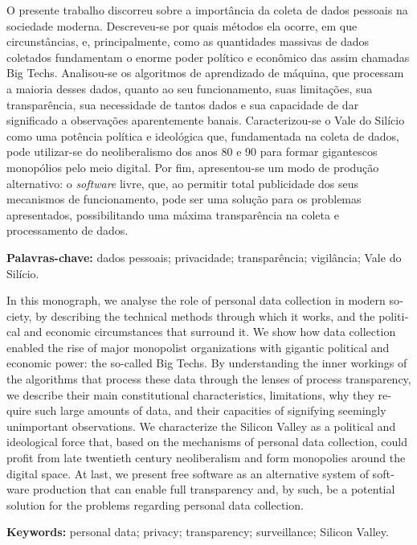 \begin{resumo}
\vspace{\onelineskip}
O presente trabalho discorreu sobre a importância da coleta de dados pessoais na sociedade moderna.
Descreveu-se por quais métodos ela ocorre, em que circunstâncias, e, principalmente, como as quantidades massivas de dados coletados fundamentam o enorme poder político e econômico das assim chamadas Big Techs.
Analisou-se os algoritmos de aprendizado de máquina, que processam a maioria desses dados, quanto ao seu funcionamento, suas limitações, sua transparência, sua necessidade de tantos dados e sua capacidade de dar significado a observações aparentemente banais.
Caracterizou-se o Vale do Silício como uma potência política e ideológica que, fundamentada na coleta de dados, pode utilizar-se do neoliberalismo dos anos 80 e 90 para formar gigantescos monopólios pelo meio digital.
Por fim, apresentou-se um modo de produção alternativo: o \textit{software} livre, que, ao permitir total publicidade dos seus mecanismos de funcionamento, pode ser uma solução para os problemas apresentados, possibilitando uma máxima transparência na coleta e processamento de dados.

\textbf{Palavras-chave:} dados pessoais; privacidade; transparência; vigilância; Vale do Silício.
\end{resumo}

\renewcommand{\resumoname}{Abstract}
\begin{resumo}
\begin{otherlanguage}{english}
\vspace{\onelineskip}
In this monograph, we analyse the role of personal data collection in modern society, by describing the technical methods through which it works, and the political and economic circumstances that surround it.
We show how data collection enabled the rise of major monopolist organizations with gigantic political and economic power: the so-called Big Techs.
By understanding the inner workings of the algorithms that process these data through the lenses of process transparency, we describe their main constitutional characteristics, limitations, why they require such large amounts of data, and their capacities of signifying seemingly unimportant observations.
We characterize the Silicon Valley as a political and ideological force that, based on the mechanisms of personal data collection, could profit from late twentieth century neoliberalism and form monopolies around the digital space.
At last, we present free software as an alternative system of software production that can enable full transparency and, by such, be a potential solution for the problems regarding personal data collection.

\textbf{Keywords:} personal data; privacy; transparency; surveillance; Silicon Valley.
\end{otherlanguage}
\end{resumo}
